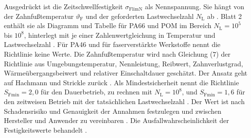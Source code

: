 Ausgedrückt ist die Zeitschwellfestigkeit $\sigma_{\mathrm{FlimN}}$ als Nennspannung. Sie hängt von der Zahnfußtemperatur $\vartheta_{\mathrm{F}}$ und der geforderten Lastwechselzahl $N_{\mathrm{L}}$ ab \cite[S.~14]{VDI2736-2}. Blatt 2 enthält sie als Diagramm und Tabelle für PA66 und POM im Bereich $N_{\mathrm{L}} = 10^{5}$ bis $10^{8}$, hinterlegt mit je einer Zahlenwertgleichung in Temperatur und Lastwechselzahl \cite[S.~14 bis 15]{VDI2736-2}. Für PA46 und für faserverstärkte Werkstoffe nennt die Richtlinie keine Werte. Die Zahnfußtemperatur wird nach Gleichung (7) der Richtlinie aus Umgebungstemperatur, Nennleistung, Reibwert, Zahnverlustgrad, Wärmeübergangsbeiwert und relativer Einschaltdauer geschätzt. Der Ansatz geht auf Hachmann und Strickle zurück \cite[S.~8 und 30]{VDI2736-2}. Als Mindestsicherheit nennt die Richtlinie $S_{\mathrm{Fmin}} = 2{,}0$ für den Dauerbetrieb, zu rechnen mit $N_{\mathrm{L}} = 10^{8}$, und $S_{\mathrm{Fmin}} = 1{,}6$ für den zeitweisen Betrieb mit der tatsächlichen Lastwechselzahl \cite[S.~14]{VDI2736-2}. Der Wert ist nach Schadensrisiko und Genauigkeit der Annahmen festzulegen und zwischen Hersteller und Anwender zu vereinbaren \cite[S.~14]{VDI2736-2}. Die Ausfallwahrscheinlichkeit der Festigkeitswerte behandelt .


